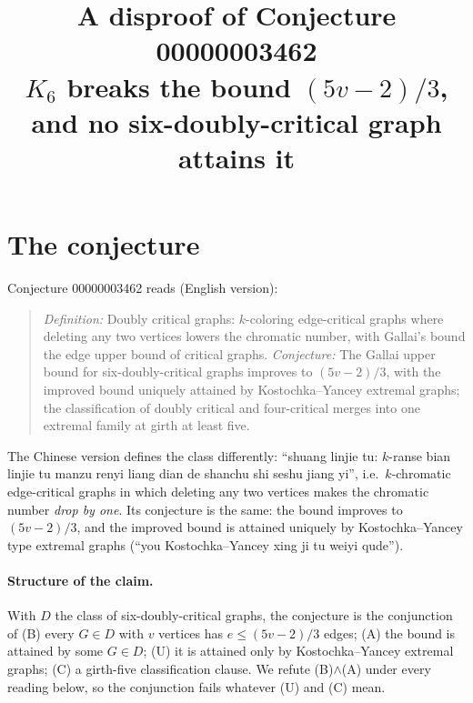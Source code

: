 \documentclass[11pt]{article}
\title{A disproof of Conjecture 00000003462\\[2pt]
\large $K_6$ breaks the bound $(5v-2)/3$, and no six-doubly-critical graph attains it}
\date{}
\theoremstyle{definition}
\theoremstyle{remark}
\renewcommand{\_}{\oldus\allowbreak}
\begin{document}
\sloppy
\maketitle

\section{The conjecture}

Conjecture 00000003462 reads (English version):
\begin{quote}
\emph{Definition:} Doubly critical graphs: $k$-coloring edge-critical graphs where deleting any two
vertices lowers the chromatic number, with Gallai's bound the edge upper bound of critical graphs.
\emph{Conjecture:} The Gallai upper bound for six-doubly-critical graphs improves to $(5v-2)/3$, with the
improved bound uniquely attained by Kostochka--Yancey extremal graphs; the classification of doubly
critical and four-critical merges into one extremal family at girth at least five.
\end{quote}
The Chinese version defines the class differently: ``shuang linjie tu: $k$-ranse bian linjie tu manzu
renyi liang dian de shanchu shi seshu jiang yi'', i.e.\ $k$-chromatic edge-critical graphs in which
deleting any two vertices makes the chromatic number \emph{drop by one}. Its conjecture is the same:
the bound improves to $(5v-2)/3$, and the improved bound is attained uniquely by Kostochka--Yancey type
extremal graphs (``you Kostochka--Yancey xing ji tu weiyi qude'').

\paragraph{Structure of the claim.} With $D$ the class of six-doubly-critical graphs, the conjecture is
the conjunction of (B) every $G\in D$ with $v$ vertices has $e\le(5v-2)/3$ edges; (A) the bound is
attained by some $G\in D$; (U) it is attained only by Kostochka--Yancey extremal graphs; (C) a
girth-five classification clause. We refute (B)$\wedge$(A) under every reading below, so the
conjunction fails whatever (U) and (C) mean.
\end{document}
